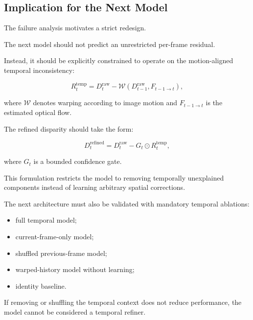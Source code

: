 \documentclass[11pt,a4paper]{article}
\begin{document}
\subsection{Implication for the Next Model}

The failure analysis motivates a strict redesign.

The next model should not predict an unrestricted per-frame residual.

Instead, it should be explicitly constrained to operate on the motion-aligned
temporal inconsistency:

\begin{equation}
R_t^{\mathrm{temp}}
=
D_t^{\mathrm{raw}}
-
\mathcal{W}
\left(
D_{t-1}^{\mathrm{raw}},
F_{t-1\rightarrow t}
\right),
\end{equation}

where $\mathcal{W}$ denotes warping according to image motion and
$F_{t-1\rightarrow t}$ is the estimated optical flow.

The refined disparity should take the form:

\begin{equation}
D_t^{\mathrm{refined}}
=
D_t^{\mathrm{raw}}
-
G_t
\odot
R_t^{\mathrm{temp}},
\end{equation}

where $G_t$ is a bounded confidence gate.

This formulation restricts the model to removing temporally unexplained components
instead of learning arbitrary spatial corrections.

The next architecture must also be validated with mandatory temporal ablations:

\begin{itemize}[leftmargin=*]
    \item full temporal model;
    \item current-frame-only model;
    \item shuffled previous-frame model;
    \item warped-history model without learning;
    \item identity baseline.
\end{itemize}

If removing or shuffling the temporal context does not reduce performance, the model
cannot be considered a temporal refiner.

\end{document}
